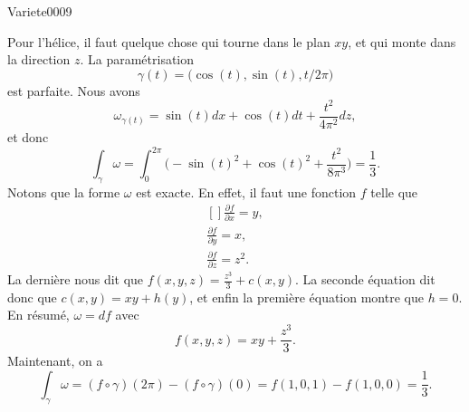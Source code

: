 
\begin{corrige}{Variete0009}

	Pour l'hélice, il faut quelque chose qui tourne dans le plan $xy$, et qui monte dans la direction $z$. La paramétrisation
	\begin{equation}
		\gamma(t)=\big( \cos(t),\sin(t),t/2\pi \big)
	\end{equation}
	est parfaite. Nous avons
	\begin{equation}
		\omega_{\gamma(t)}=\sin(t)dx+\cos(t)dt+\frac{ t^2 }{ 4\pi^2 }dz,
	\end{equation}
	et donc
	\begin{equation}
		\int_{\gamma}\omega=\int_0^{2\pi}\big( -\sin(t)^2+\cos(t)^2+\frac{ t^2 }{ 8\pi^3 } \big)=\frac{ 1 }{ 3 }.
	\end{equation}
	Notons que la forme $\omega$ est exacte. En effet, il faut une fonction $f$ telle que
	\begin{equation}
		\begin{aligned}[]
			\frac{ \partial f }{ \partial x }=y,\\
			\frac{ \partial f }{ \partial y }=x,\\
			\frac{ \partial f }{ \partial z }=z^2.
		\end{aligned}
	\end{equation}
	La dernière nous dit que $f(x,y,z)=\frac{ z^3 }{ 3 }+c(x,y)$. La seconde équation dit donc que $c(x,y)=xy+h(y)$, et enfin la première équation montre que $h=0$. En résumé, $\omega=df$ avec
	\begin{equation}
		f(x,y,z)=xy+\frac{ z^3 }{ 3 }.
	\end{equation}
	Maintenant, on a
	\begin{equation}
		\int_{\gamma}\omega=(f\circ\gamma)(2\pi)-(f\circ\gamma)(0)=f(1,0,1)-f(1,0,0)=\frac{1}{ 3 }.
	\end{equation}
	

\end{corrige}
